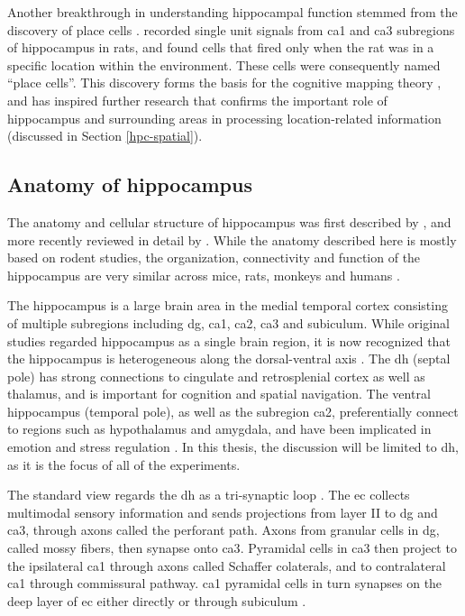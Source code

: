 Another breakthrough in understanding hippocampal function stemmed from the discovery of place cells \citep{o'keefe71}. \citet{o'keefe71} recorded single unit signals from \gls{ca1} and \gls{ca3} subregions of hippocampus in rats, and found cells that fired only when the rat was in a specific location within the environment. These cells were consequently named ``place cells''. This discovery forms the basis for the cognitive mapping theory \citep{o'keefe76}, and has inspired further research that confirms the important role of hippocampus and surrounding areas in processing location-related information (discussed in Section \ref{hpc-spatial}).

\subsection{Anatomy of hippocampus}
The anatomy and cellular structure of hippocampus was first described by \citet{cajal93}, and more recently reviewed in detail by \citet{strien09}. While the anatomy described here is mostly based on rodent studies, the organization, connectivity and function of the hippocampus are very similar across mice, rats, monkeys and humans \citep{clark13}. 

The hippocampus is a large brain area in the medial temporal cortex consisting of multiple subregions including \gls{dg}, \gls{ca1}, \gls{ca2}, \gls{ca3} and subiculum. While original studies regarded hippocampus as a single brain region, it is now recognized that the hippocampus is heterogeneous along the dorsal-ventral axis \citep{moser98, fanselow10}. The \gls{dh} (septal pole) has strong connections to cingulate and retrosplenial cortex as well as thalamus, and is important for cognition and spatial navigation. The ventral hippocampus (temporal pole), as well as the subregion \gls{ca2}, preferentially connect to regions such as hypothalamus and amygdala, and have been implicated in emotion and stress regulation \citep{fanselow10, chevaleyre16}. In this thesis, the discussion will be limited to \gls{dh}, as it is the focus of all of the experiments.

The standard view regards the \gls{dh} as a tri-synaptic loop \citep{strien09}. The \gls{ec} collects multimodal sensory information and sends projections from layer II to \gls{dg} and \gls{ca3}, through axons called the perforant path. Axons from granular cells in \gls{dg}, called mossy fibers, then synapse onto \gls{ca3}. Pyramidal cells in \gls{ca3} then project to the ipsilateral \gls{ca1} through axons called Schaffer colaterals, and to contralateral \gls{ca1} through commissural pathway. \gls{ca1} pyramidal cells in turn synapses on the deep layer of \gls{ec} either directly or through subiculum \citep{strien09}.

